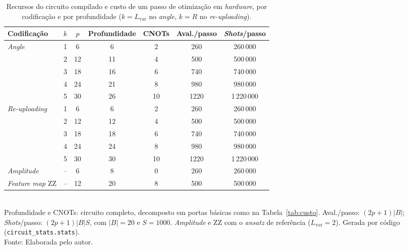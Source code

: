 \begin{table}[htb]
\centering
\small
\caption[Recursos por codificação e profundidade]{Recursos do circuito compilado e custo de um passo de otimização em \textit{hardware}, por codificação e por profundidade ($k = L_\text{var}$ no \textit{angle}, $k = R$ no \textit{re-uploading}).}
\label{tab:recursos-profundidade}
\begin{tabular}{lcccccc}
\toprule
Codificação & $k$ & $p$ & Profundidade & CNOTs & Aval./passo & \textit{Shots}/passo \\
\midrule
\textit{Angle} & 1 & 6 & 6 & 2 & 260 & 260\,000 \\
 & 2 & 12 & 11 & 4 & 500 & 500\,000 \\
 & 3 & 18 & 16 & 6 & 740 & 740\,000 \\
 & 4 & 24 & 21 & 8 & 980 & 980\,000 \\
 & 5 & 30 & 26 & 10 & 1220 & 1\,220\,000 \\
\midrule
\textit{Re-uploading} & 1 & 6 & 6 & 2 & 260 & 260\,000 \\
 & 2 & 12 & 12 & 4 & 500 & 500\,000 \\
 & 3 & 18 & 18 & 6 & 740 & 740\,000 \\
 & 4 & 24 & 24 & 8 & 980 & 980\,000 \\
 & 5 & 30 & 30 & 10 & 1220 & 1\,220\,000 \\
\midrule
\textit{Amplitude} & -- & 6 & 8 & 0 & 260 & 260\,000 \\
\midrule
\textit{Feature map} ZZ & -- & 12 & 20 & 8 & 500 & 500\,000 \\
\bottomrule
\end{tabular}
\\[2pt]
{\footnotesize Profundidade e CNOTs: circuito completo, decomposto em portas básicas como na Tabela~\ref{tab:custo}. Aval./passo: $(2p + 1)|B|$; \textit{Shots}/passo: $(2p + 1)|B|S$, com $|B| = 20$ e $S = 1000$. \textit{Amplitude} e ZZ com o \textit{ansatz} de referência ($L_\text{var} = 2$). Gerada por código (\texttt{circuit\_stats.stats}).}
\\[2pt]
{\footnotesize Fonte: Elaborada pelo autor.}
\end{table}
